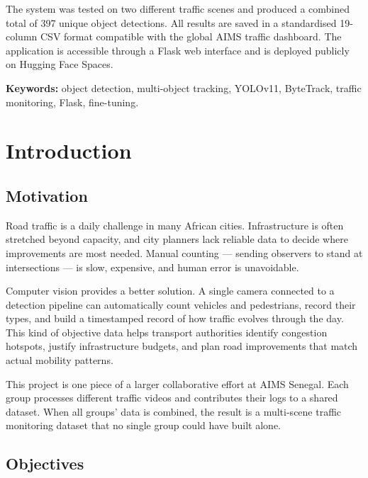\documentclass[12pt,a4paper,leqno]{report}
\begin{document}
The system was tested on two different traffic scenes and produced a combined total of 397 unique object detections. All results are saved in a standardised 19-column CSV format compatible with the global AIMS traffic dashboard. The application is accessible through a Flask web interface and is deployed publicly on Hugging Face Spaces.

\noindent\textbf{Keywords:} object detection, multi-object tracking, YOLOv11, ByteTrack, traffic monitoring, Flask, fine-tuning.

\tableofcontents\newpage
{}\setcounter{page}{1}

\chapter{Introduction}

\section{Motivation}

Road traffic is a daily challenge in many African cities. Infrastructure is often stretched beyond capacity, and city planners lack reliable data to decide where improvements are most needed. Manual counting — sending observers to stand at intersections — is slow, expensive, and human error is unavoidable.

Computer vision provides a better solution. A single camera connected to a detection pipeline can automatically count vehicles and pedestrians, record their types, and build a timestamped record of how traffic evolves through the day. This kind of objective data helps transport authorities identify congestion hotspots, justify infrastructure budgets, and plan road improvements that match actual mobility patterns.

This project is one piece of a larger collaborative effort at AIMS Senegal. Each group processes different traffic videos and contributes their logs to a shared dataset. When all groups' data is combined, the result is a multi-scene traffic monitoring dataset that no single group could have built alone.

\section{Objectives}
\end{document}

